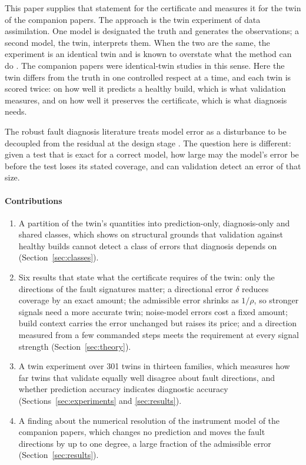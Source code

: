 \documentclass[preprint,12pt]{elsarticle}
\begin{document}
This paper supplies that statement for the certificate and measures it for the
twin of the companion papers. The approach is the twin experiment of data
assimilation. One model is designated the truth and generates the observations;
a second model, the twin, interprets them. When the two are the same, the
experiment is an identical twin and is known to overstate what the method can
do \cite{Yu2019}. The companion papers were identical-twin studies in this sense.
Here the twin differs from the truth in one controlled respect at a time, and
each twin is scored twice: on how well it predicts a healthy build, which is
what validation measures, and on how well it preserves the certificate, which is
what diagnosis needs.

The robust fault diagnosis literature treats model error as a disturbance to be
decoupled from the residual at the design stage \cite{ChenPatton1999}. The
question here is different: given a test that is exact for a correct model, how
large may the model's error be before the test loses its stated coverage, and
can validation detect an error of that size.

\paragraph{Contributions}
\begin{enumerate}
\item A partition of the twin's quantities into prediction-only,
diagnosis-only and shared classes, which shows on structural grounds that
validation against healthy builds cannot detect a class of errors that
diagnosis depends on (Section~\ref{sec:classes}).
\item Six results that state what the certificate requires of the twin: only
the directions of the fault signatures matter; a directional error $\delta$
reduces coverage by an exact amount; the admissible error shrinks as $1/\rho$,
so stronger signals need a more accurate twin; noise-model errors cost a fixed
amount; build context carries the error unchanged but raises its price; and a
direction measured from a few commanded steps meets the requirement at every
signal strength (Section~\ref{sec:theory}).
\item A twin experiment over 301 twins in thirteen families, which measures
how far twins that validate equally well disagree about fault directions, and
whether prediction accuracy indicates diagnostic accuracy
(Sections~\ref{sec:experiments} and \ref{sec:results}).
\item A finding about the numerical resolution of the instrument model of the
companion papers, which changes no prediction and moves the fault directions by
up to one degree, a large fraction of the admissible error
(Section~\ref{sec:results}).
\end{enumerate}
\end{document}
